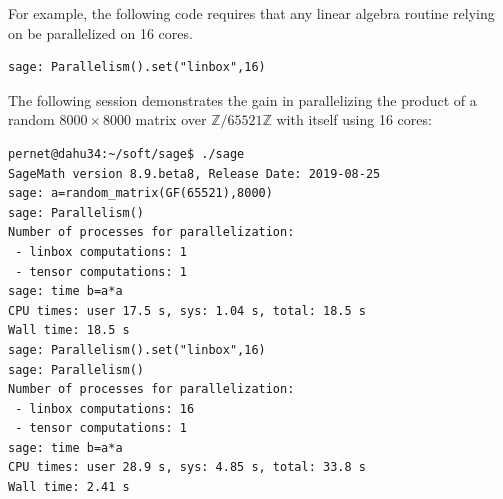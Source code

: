\documentclass{deliverablereport}
\begin{document}
For example, the following code requires that any linear algebra routine relying on \Linbox be parallelized on 16 cores.

\begin{lstlisting}
sage: Parallelism().set("linbox",16)
\end{lstlisting}

The following session demonstrates the gain in parallelizing the product of a random $8000\times 8000$ matrix over
$\mathbb{Z}/65521\mathbb{Z}$ with itself using 16 cores:
\begin{lstlisting}
pernet@dahu34:~/soft/sage$ ./sage 
SageMath version 8.9.beta8, Release Date: 2019-08-25
sage: a=random_matrix(GF(65521),8000)
sage: Parallelism()
Number of processes for parallelization:
 - linbox computations: 1
 - tensor computations: 1
sage: time b=a*a
CPU times: user 17.5 s, sys: 1.04 s, total: 18.5 s
Wall time: 18.5 s
sage: Parallelism().set("linbox",16)
sage: Parallelism()
Number of processes for parallelization:
 - linbox computations: 16
 - tensor computations: 1
sage: time b=a*a
CPU times: user 28.9 s, sys: 4.85 s, total: 33.8 s
Wall time: 2.41 s
\end{lstlisting}
\end{document}
